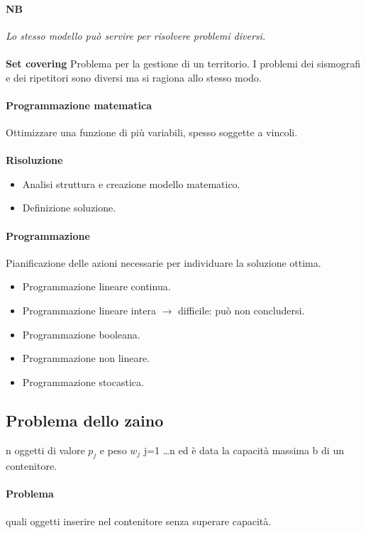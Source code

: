 \documentclass[12pt, letterpaper]{article}
\begin{document}
	\paragraph{NB}\textit{Lo stesso modello può servire per risolvere problemi diversi.}
	\\\\\textbf{Set covering }Problema per la gestione di un territorio. I problemi dei sismografi e dei ripetitori sono diversi ma si ragiona allo stesso modo.
	\paragraph{Programmazione matematica}Ottimizzare una funzione di più variabili, spesso soggette a vincoli.
	\\\\\textbf{Risoluzione}
	\begin{itemize}
		\item Analisi struttura e creazione modello matematico.
		\item Definizione soluzione.
	\end{itemize}
	\paragraph{Programmazione}Pianificazione delle azioni necessarie per individuare la soluzione ottima.
	\begin{itemize}
		\item Programmazione lineare continua.
		\item Programmazione lineare intera $\rightarrow$ difficile: può non concludersi.
		\item Programmazione booleana.
		\item Programmazione non lineare.
		\item Programmazione stocastica.
	\end{itemize}
	\subsection{Problema dello zaino} n oggetti di valore $p_j$ e peso $w_j$ j=1 \dots n ed è data la capacità massima b di un contenitore.
	\paragraph{Problema} quali oggetti inserire nel contenitore senza superare capacità. 
\end{document}
